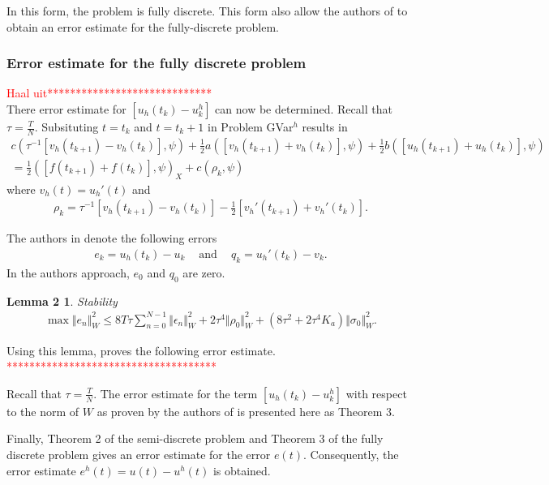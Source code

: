 \documentclass[../../main.tex]{subfiles}
\begin{document}
In this form, the problem is fully discrete. This form also allow the authors of \cite{BV13} to obtain an error estimate for the fully-discrete problem.

\subsubsection{Error estimate for the fully discrete problem}

\textcolor{red}{Haal uit*****************************}\\
There error estimate for $[u_h(t_k) - u^h_k]$ can now be determined. Recall that $\tau = \frac{T}{N}$. Subsituting $t = t_k$ and $t = t_k+1$ in Problem GVar$^h$ results in
\begin{eqnarray*}
	c( \tau^{-1}[v_{h}(t_{k+1})-v_{h}(t_{k})], \psi)+\frac{1}{2}a([v_{h}(t_{k+1})+v_{h}(t_{k})], \psi)+\frac{1}{2}b([u_{h}(t_{k+1})+u_{h}(t_{k})], \psi) \\
	=\frac{1}{2}([f(t_{k+1})+f(t_{k})], \psi)_{X}+c(\rho_{k}, \psi)
\end{eqnarray*}
where $v_{h}(t)=u_{h}'(t)$ and
\begin{eqnarray*}
	\rho_{k}=\tau^{-1}[v_{h}(t_{k+1})-v_{h}(t_{k})]-\frac{1}{2}[v_{h}'(t_{k+1})+v_{h}'(t_{k})].
\end{eqnarray*}

The authors in \cite{BV13} denote the following errors
\begin{eqnarray*}
	e_{k}=u_{h}(t_{k})-u_{k} \ \ \ \ \textrm{ and } \ \ \ \ q_{k}=u_{h}'(t_{k})-v_{k}.
\end{eqnarray*} In the authors approach, $e_0$ and $q_0$ are zero.

\newtheorem*{DC_Lem3}{Lemma 2}
\begin{DC_Lem3}
	Stability
	\begin{eqnarray*}
		\max\Vert e_{n}\Vert_{W}^{2}\leq 8T\tau\sum_{n=0}^{N-1}\Vert\epsilon_{n}\Vert_{W}^{2}+2\tau^{4}\Vert\rho_{0}\Vert_{W}^{2}+(8\tau^{2}+2\tau^{4}K_{a})\Vert\sigma_{0}\Vert_{W}^{2}.
	\end{eqnarray*}
\end{DC_Lem3}

Using this lemma, \cite{BV13} proves the following error estimate.\\
\textcolor{red}{*************************************}

Recall that $\displaystyle \tau = \frac{T}{N}$. The error estimate for the term $[u_h(t_k) - u^h_k]$ with respect to the norm of $W$ as proven by the authors of \cite{BV13} is presented here as Theorem 3.



Finally, Theorem 2 of the semi-discrete problem and Theorem 3 of the fully discrete problem gives an error estimate for the error $e(t)$. Consequently, the error estimate $e^h(t) = u(t) - u^h(t)$ is obtained.
\end{document}
